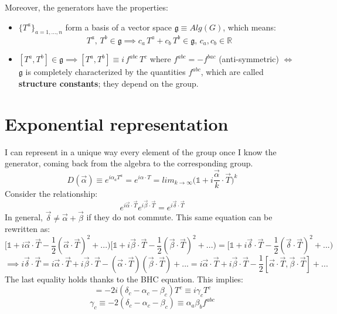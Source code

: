 \documentclass[../../main/main.tex]{subfiles}
\begin{document}
Moreover, the generators have the properties:
\begin{itemize}
\item $\{T^a \}_{a=1,...,n}$ form a basis of a vector space $\mathfrak{g} \equiv Alg(G)$, which means:
\begin{equation*}
T^a, \, T^b \in \mathfrak{g}  \implies c_a\, T^a + c_b\, T^b \in \mathfrak{g} , \, c_a, c_b \in \mathbb{R}
\end{equation*}
\item $[T^a, T^b] \in \mathfrak{g} \implies [T^a, T^b] \equiv i \, f^{abc} \, T^{c}$ where $f^{abc}=-f^{bac}$ (anti-symmetric) $\iff$ $\mathfrak{g}$ is completely characterized by the quantities $f^{abc}$, which are called \textbf{structure constants}; they depend on the group.
\end{itemize}

\section{Exponential representation}
I can represent in a unique way every element of the group once I know the generator, coming back from the algebra to the corresponding group.
\begin{equation*}
D(\vec{\alpha}) \equiv e^{i \alpha_a T^a} = e^{i \alpha \cdot T} = lim_{k \to \infty} \Big( \mathbb{1} + i \frac{\vec{\alpha}}{k} \cdot \vec{T}\Big)^k
\end{equation*}
Consider the relationship:
\begin{equation*}
e^{i \vec{\alpha} \cdot \vec{T}} e^{i \vec{\beta} \cdot \vec{T}} = e^{i \vec{\delta} \cdot \vec{T}}
\end{equation*}
In general, $\vec{\delta} \ne \vec{\alpha} + \vec{\beta}$ if they do not commute. This same equation can be rewritten as:
\begin{equation*}
\Big[\mathbb{1}+i\vec{\alpha}\cdot \vec{T} -\frac{1}{2} (\vec{\alpha}\cdot \vec{T})^2+...\Big)\Big[\mathbb{1}+i\vec{\beta}\cdot \vec{T} -\frac{1}{2} (\vec{\beta}\cdot \vec{T})^2+...\Big) = \Big[\mathbb{1}+i\vec{\delta}\cdot \vec{T} -\frac{1}{2} (\vec{\delta}\cdot \vec{T})^2+...\Big)
\end{equation*}
\begin{equation*}
\implies i\vec{\delta}\cdot \vec{T}=i\vec{\alpha}\cdot \vec{T} + i\vec{\beta}\cdot \vec{T} - (\vec{\alpha}\cdot \vec{T})(\vec{\beta}\cdot \vec{T})+...= i\vec{\alpha}\cdot \vec{T} + i\vec{\beta}\cdot \vec{T} - \frac{1}{2} [\vec{\alpha}\cdot \vec{T}, \vec{\beta}\cdot \vec{T}] +...
\end{equation*}
The last equality holds thanks to the BHC equation. This implies:
\begin{equation*}
[\alpha_a T^a, \beta_bT^b]=-2i(\delta_c-\alpha_c-\beta_c)T^c\equiv i\gamma_c T^c
\end{equation*}
\begin{equation*}
\gamma_c \equiv -2 (\delta_c - \alpha_c - \beta_c) \equiv \alpha_a \beta_b f^{abc}
\end{equation*}
\end{document}
